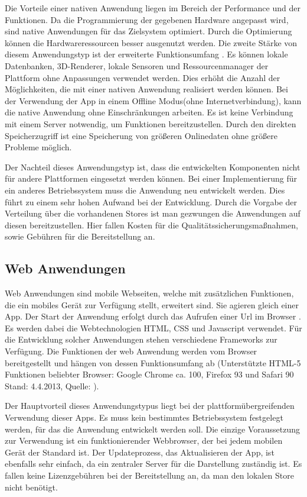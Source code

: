  Die Vorteile einer nativen Anwendung liegen im Bereich der Performance und der Funktionen. Da die Programmierung der gegebenen Hardware angepasst wird, sind native Anwendungen für das Zielsystem optimiert. Durch die Optimierung können die Hardwareressourcen besser ausgenutzt werden. Die zweite Stärke von diesem Anwendungstyp ist der erweiterte Funktionsumfang \cite{bib:nativeBS2}. Es können lokale Datenbanken, 3D-Renderer, lokale Sensoren und Ressourcenmanager der Plattform ohne Anpassungen verwendet werden. Dies erhöht die Anzahl der Möglichkeiten, die mit einer nativen Anwendung realisiert werden können. Bei der Verwendung der App in einem Offline Modus(ohne Internetverbindung), kann die native Anwendung ohne Einschränkungen arbeiten. Es ist keine Verbindung mit einem Server notwendig, um Funktionen bereitzustellen. Durch den direkten Speicherzugriff ist eine Speicherung von größeren Onlinedaten ohne größere Probleme möglich. \par
 
 Der Nachteil dieses Anwendungstyp ist, dass die entwickelten Komponenten nicht für andere Plattformen eingesetzt werden können. Bei einer Implementierung für ein anderes Betriebssystem muss die Anwendung neu entwickelt werden. Dies führt zu einem sehr hohen Aufwand bei der Entwicklung. Durch die Vorgabe der Verteilung über die vorhandenen Stores ist man gezwungen die Anwendungen auf diesen bereitzustellen. Hier fallen Kosten für die Qualitätssicherungsmaßnahmen, sowie Gebühren für die Bereitstellung an.

\subsection{Web Anwendungen}
Web Anwendungen sind mobile Webseiten, welche mit zusätzlichen Funktionen, die ein mobiles Gerät zur Verfügung stellt, erweitert sind. Sie agieren gleich einer App. Der Start der Anwendung erfolgt durch das Aufrufen einer Url im Browser . Es werden dabei die Webtechnologien HTML, CSS und Javascript verwendet. Für die Entwicklung solcher Anwendungen stehen verschiedene Frameworks zur Verfügung. Die Funktionen der web Anwendung werden vom Browser bereitgestellt und hängen von dessen Funktionsumfang ab (Unterstützte HTML-5 Funktionen beliebter Browser: Google Chrome ca. 100, Firefox 93 und Safari 90 Stand: 4.4.2013, Quelle: \cite{bib:webapp}).   \par

Der Hauptvorteil dieses Anwendungstypus liegt bei der plattformübergreifenden Verwendung dieser Apps. Es muss kein bestimmtes Betriebssystem festgelegt werden, für das die Anwendung entwickelt werden soll. Die einzige Voraussetzung zur Verwendung ist ein funktionierender Webbrowser, der bei jedem mobilen Gerät der Standard ist. Der Updateprozess, das Aktualisieren der App, ist ebenfalls sehr einfach, da ein zentraler Server für die Darstellung zuständig ist. Es fallen keine Lizenzgebühren bei der Bereitstellung an, da man den lokalen Store nicht benötigt. 

